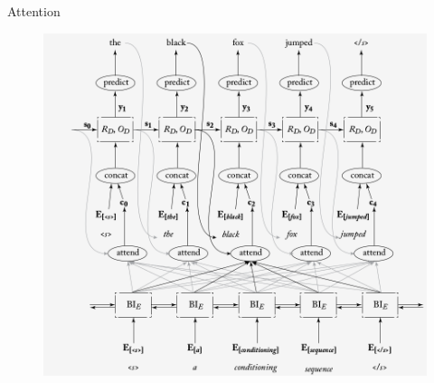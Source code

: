 \begin{frame}{Attention}
         \begin{figure}[h]
        	\includegraphics[scale = 0.35]{pics/encdecattention.png}
        \end{figure}  
\end{frame}



